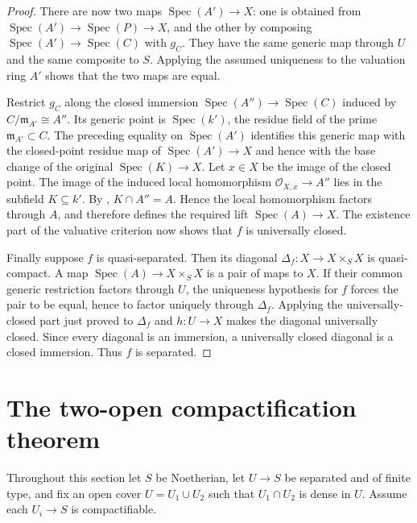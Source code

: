 \begin{proof}
  There are now two maps \(\operatorname{Spec}(A')\to X\): one is obtained
  from \(\operatorname{Spec}(A')\to\operatorname{Spec}(P)\to X\), and the
  other by composing \(\operatorname{Spec}(A')\to\operatorname{Spec}(C)\)
  with \(g_C\).  They have the same generic map through \(U\) and the same
  composite to \(S\).  Applying the assumed uniqueness to the valuation ring
  \(A'\) shows that the two maps are equal.

  Restrict $g_C$ along the closed immersion
  $\operatorname{Spec}(A'')\to\operatorname{Spec}(C)$ induced by
  $C/\mathfrak m_{A'}\cong A''$.  Its generic point is
  $\operatorname{Spec}(k')$, the residue field of the prime
  $\mathfrak m_{A'}\subset C$.  The preceding equality on
  $\operatorname{Spec}(A')$ identifies this generic map with the closed-point
  residue map of $\operatorname{Spec}(A')\to X$ and hence with the base
  change of the original $\operatorname{Spec}(K)\to X$.  Let \(x\in X\) be the image
  of the closed point.  The image of the induced local homomorphism
  \(\mathcal O_{X,x}\to A''\) lies in the subfield \(K\subseteq k'\).
  By ,
  \(K\cap A''=A\).  Hence the local homomorphism factors through \(A\), and
  therefore defines the required lift \(\operatorname{Spec}(A)\to X\).
  The existence part of the valuative criterion now shows that \(f\) is
  universally closed.

  Finally suppose \(f\) is quasi-separated.  Then its diagonal
  \(\Delta_f\colon X\to X\times_SX\) is quasi-compact.  A map
  \(\operatorname{Spec}(A)\to X\times_SX\) is a pair of maps to \(X\).
  If their common generic restriction factors through \(U\), the uniqueness
  hypothesis for \(f\) forces the pair to be equal, hence to factor uniquely
  through \(\Delta_f\).  Applying the universally-closed part just proved to
  \(\Delta_f\) and \(h\colon U\to X\) makes the diagonal universally closed.
  Since every diagonal is an immersion, a universally closed diagonal is a
  closed immersion.  Thus \(f\) is separated.
\end{proof}

\section{The two-open compactification theorem}

Throughout this section let $S$ be Noetherian, let $U\to S$ be separated and
of finite type, and fix an open cover $U=U_1\cup U_2$ such that
$U_1\cap U_2$ is dense in $U$.  Assume each $U_i\to S$ is compactifiable.

